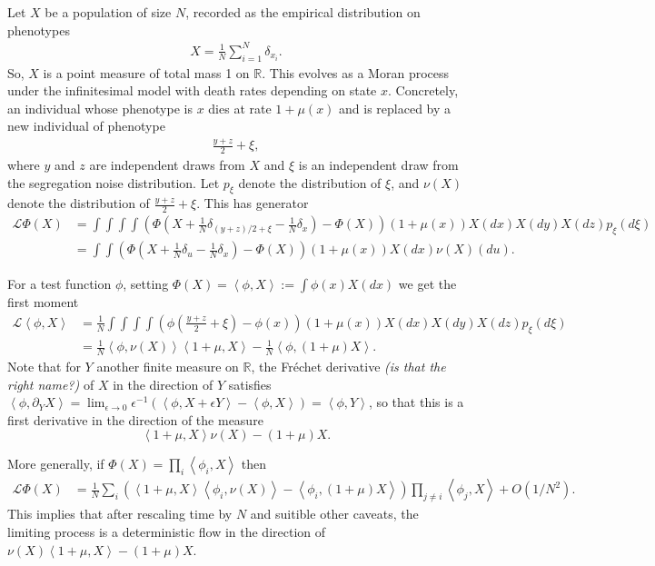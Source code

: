 \documentclass{article}
\newcommand{\R}{\mathbb{R}}
\newcommand{\mL}{\mathcal{L}}
\newcommand{\ip}[2]{\left\langle #1, #2 \right\rangle}
\newcommand{\comment}[1]{{\color{blue} \it #1}}
\theoremstyle{remark}
\theoremstyle{definition}
\begin{document}
Let $X$ be a population of size $N$, recorded as the empirical distribution on phenotypes
\begin{align*}
    X = \frac{1}{N} \sum_{i=1}^N \delta_{x_i} .
\end{align*}
So, $X$ is a point measure of total mass 1 on $\R$.
This evolves as a Moran process under the infinitesimal model
with death rates depending on state $x$.
Concretely, an individual whose phenotype is $x$
dies at rate $1 + \mu(x)$
and is replaced by a new individual of phenotype
\begin{align*}
  \frac{y + z}{2} + \xi ,
\end{align*}
where $y$ and $z$ are independent draws from $X$
and $\xi$ is an independent draw from the segregation noise distribution.
Let $p_\xi$ denote the distribution of $\xi$,
and $\nu(X)$ denote the distribution of $\frac{y + z}{2} + \xi$.
This has generator
\begin{align*}
    \mL \Phi(X)
    &=
    \int \int \int \int
    \left( \Phi\left( X + \frac{1}{N} \delta_{(y+z)/2 + \xi} - \frac{1}{N} \delta_x \right) - \Phi(X) \right)
    (1 + \mu(x)) X(dx) X(dy) X(dz) p_\xi(d\xi) \\
    &=
    \int \int
    \left( \Phi\left(X + \frac{1}{N} \delta_u - \frac{1}{N} \delta_x\right) - \Phi(X) \right)
    (1 + \mu(x)) X(dx) \nu(X)(du) .
\end{align*}

For a test function $\phi$, setting $\Phi(X) = \ip{\phi}{X} := \int \phi(x) X(dx)$
we get the first moment
\begin{align*}
    \mL \ip{\phi}{X}
    &=
    \frac{1}{N} \int \int \int \int
    \left( \phi \left( \frac{y+z}{2} + \xi \right)
         - \phi(x) \right)
    (1 + \mu(x)) X(dx) X(dy) X(dz) p_\xi(d\xi) \\
    &=
    \frac{1}{N} \ip{\phi}{\nu(X)}\ip{1+\mu}{X}
    - \frac{1}{N} \ip{\phi}{(1+\mu) X} .
\end{align*}
Note that for $Y$ another finite measure on $\R$,
the Fr\'echet derivative \comment{(is that the right name?)} of $X$ in the direction of $Y$
satisfies $\ip{\phi}{\partial_Y X} = \lim_{\epsilon \to 0} \epsilon^{-1} (\ip{\phi}{X + \epsilon Y} - \ip{\phi}{X}) = \ip{\phi}{Y}$,
so that this is a first derivative in the direction of the measure
$$ \ip{1+\mu}{X} \nu(X) - (1+\mu) X . $$

More generally, if $\Phi(X) = \prod_i \ip{\phi_i}{X}$ then
\begin{align*}
    \mL \Phi(X)
    &=
    \frac{1}{N} \sum_i \left( 
        \ip{1+\mu}{X} \ip{\phi_i}{\nu(X)}  - \ip{\phi_i}{(1+\mu)X}
    \right)
    \prod_{j \neq i} \ip{\phi_j}{X} 
    + O(1/N^2) .
\end{align*}
This implies that after rescaling time by $N$
and suitible other caveats,
the limiting process is a deterministic flow in the direction of 
$\nu(X) \ip{1+\mu}{X} - (1+\mu)X$.
\end{document}
